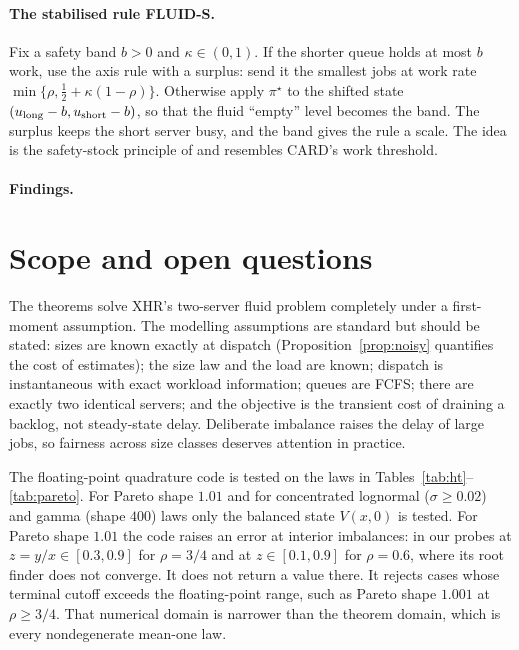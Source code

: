 \documentclass[11pt]{article}
\numberwithin{equation}{section}
\theoremstyle{definition}
\theoremstyle{remark}
\begin{document}
\paragraph{The stabilised rule FLUID-S.} Fix a safety band $b>0$ and $\kappa\in(0,1)$. If the shorter queue holds at most $b$ work, use the axis rule with a surplus: send it the smallest jobs at work rate $\min\{\rho,\tfrac12+\kappa(1-\rho)\}$. Otherwise apply $\pi^\star$ to the shifted state $(u_{\rm long}-b,u_{\rm short}-b)$, so that the fluid ``empty'' level becomes the band. The surplus keeps the short server busy, and the band gives the rule a scale. The idea is the safety-stock principle of \cite{Meyn2008} and resembles CARD's work threshold.



\paragraph{Findings.} 

\section{Scope and open questions}\label{sec:scope}

The theorems solve XHR's two-server fluid problem completely under a first-moment assumption. The modelling assumptions are standard but should be stated: sizes are known exactly at dispatch (Proposition~\ref{prop:noisy} quantifies the cost of estimates); the size law and the load are known; dispatch is instantaneous with exact workload information; queues are FCFS; there are exactly two identical servers; and the objective is the transient cost of draining a backlog, not steady-state delay. Deliberate imbalance raises the delay of large jobs, so fairness across size classes deserves attention in practice.

The floating-point quadrature code is tested on the laws in Tables~\ref{tab:ht}--\ref{tab:pareto}. For Pareto shape $1.01$ and for concentrated lognormal ($\sigma\ge0.02$) and gamma (shape $400$) laws only the balanced state $V(x,0)$ is tested. For Pareto shape $1.01$ the code raises an error at interior imbalances: in our probes at $z=y/x\in[0.3,0.9]$ for $\rho=3/4$ and at $z\in[0.1,0.9]$ for $\rho=0.6$, where its root finder does not converge. It does not return a value there. It rejects cases whose terminal cutoff exceeds the floating-point range, such as Pareto shape $1.001$ at $\rho\ge3/4$. That numerical domain is narrower than the theorem domain, which is every nondegenerate mean-one law.
\end{document}
